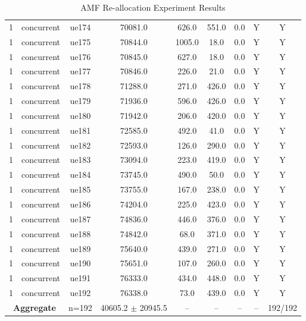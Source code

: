 \begin{table}[ht]
\begin{tabular}{|c|c|c|c|c|c|c|c|c|}
1 & concurrent & ue174 & 70081.0 & 626.0 & 551.0 & 0.0 & Y & Y \\
1 & concurrent & ue175 & 70844.0 & 1005.0 & 18.0 & 0.0 & Y & Y \\
1 & concurrent & ue176 & 70845.0 & 627.0 & 18.0 & 0.0 & Y & Y \\
1 & concurrent & ue177 & 70846.0 & 226.0 & 21.0 & 0.0 & Y & Y \\
1 & concurrent & ue178 & 71288.0 & 271.0 & 426.0 & 0.0 & Y & Y \\
1 & concurrent & ue179 & 71936.0 & 596.0 & 426.0 & 0.0 & Y & Y \\
1 & concurrent & ue180 & 71942.0 & 206.0 & 420.0 & 0.0 & Y & Y \\
1 & concurrent & ue181 & 72585.0 & 492.0 & 41.0 & 0.0 & Y & Y \\
1 & concurrent & ue182 & 72593.0 & 126.0 & 290.0 & 0.0 & Y & Y \\
1 & concurrent & ue183 & 73094.0 & 223.0 & 419.0 & 0.0 & Y & Y \\
1 & concurrent & ue184 & 73745.0 & 490.0 & 50.0 & 0.0 & Y & Y \\
1 & concurrent & ue185 & 73755.0 & 167.0 & 238.0 & 0.0 & Y & Y \\
1 & concurrent & ue186 & 74204.0 & 225.0 & 423.0 & 0.0 & Y & Y \\
1 & concurrent & ue187 & 74836.0 & 446.0 & 376.0 & 0.0 & Y & Y \\
1 & concurrent & ue188 & 74842.0 & 68.0 & 371.0 & 0.0 & Y & Y \\
1 & concurrent & ue189 & 75640.0 & 439.0 & 271.0 & 0.0 & Y & Y \\
1 & concurrent & ue190 & 75651.0 & 107.0 & 260.0 & 0.0 & Y & Y \\
1 & concurrent & ue191 & 76333.0 & 434.0 & 448.0 & 0.0 & Y & Y \\
1 & concurrent & ue192 & 76338.0 & 73.0 & 439.0 & 0.0 & Y & Y \\
\multicolumn{2}{|c|}{\textbf{Aggregate}} & n=192 & 40605.2 $\pm$ 20945.5 & -- & -- & -- & -- & 192/192 \\
\hline
\end{tabular}
\caption{AMF Re-allocation Experiment Results}
\label{tab:amf_realloc}
\end{table}
